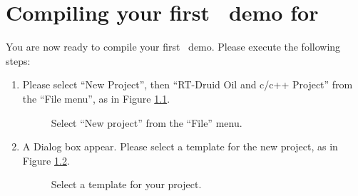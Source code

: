 \begin{enumerate}

\end{enumerate}


\chapter{Compiling your first \ee\ demo for }

You are now ready to compile your first \ee\ demo. Please execute the
following steps:

\begin{enumerate}

\item
  Please select ``New Project'', then ``RT-Druid Oil and c/c++
  Project'' from the ``File menu'', as in Figure
  \ref{fig:new-project}.
%
\begin{figure}[htb]
\caption{Select ``New project'' from the ``File'' menu.}
\label{fig:new-project}
\end{figure}

\item
  A Dialog box appear. Please select a template for the new project,
  as in Figure \ref{fig:new-project2}.
%
\begin{figure}[htb]
\caption{Select a template for your project.}
\label{fig:new-project2}
\end{figure}


\end{enumerate}
